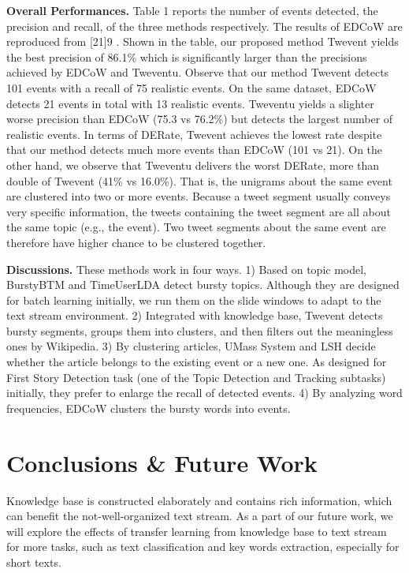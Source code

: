 \documentclass{article}
\begin{document}
\textbf{Overall Performances.}
Table 1 reports the number of events
detected, the precision and recall, of the three methods respectively.
The results of EDCoW are reproduced from [21]9
. Shown in the
table, our proposed method Twevent yields the best precision of
86.1\% which is significantly larger than the precisions achieved
by EDCoW and Tweventu. Observe that our method Twevent detects
101 events with a recall of 75 realistic events. On the same
dataset, EDCoW detects 21 events in total with 13 realistic events.
Tweventu yields a slighter worse precision than EDCoW (75.3%
vs 76.2\%) but detects the largest number of realistic events. In
terms of DERate, Twevent achieves the lowest rate despite that our
method detects much more events than EDCoW (101 vs 21). On
the other hand, we observe that Tweventu delivers the worst DERate,
more than double of Twevent (41\% vs 16.0\%). That is, the unigrams
about the same event are clustered into two or more events.
Because a tweet segment usually conveys very specific information,
the tweets containing the tweet segment are all about the same
topic (e.g., the event). Two tweet segments about the same event
are therefore have higher chance to be clustered together.

\textbf{Discussions.} 
These methods work in four ways. 
1) Based on topic model, BurstyBTM and TimeUserLDA detect bursty topics. 
Although they are designed for batch learning initially, we run them on the slide windows to adapt to the text stream environment.
2) Integrated with knowledge base, Twevent detects bursty segments, groups them into clusters, and then filters out the meaningless ones by Wikipedia.
3) By clustering articles, UMass System and LSH decide whether the article belongs to the existing event or a new one.
As designed for First Story Detection task (one of the Topic Detection and Tracking subtasks\cite{allan2012topic}) initially, they prefer to enlarge the recall of detected events. 
4) By analyzing word frequencies, EDCoW clusters the bursty words into events.

\section{Conclusions \& Future Work}
Knowledge base is constructed elaborately and contains rich information, which can benefit the not-well-organized text stream. 
As a part of our future work, we will explore the effects of transfer learning from knowledge base to text stream for more tasks, such as text classification and key words extraction, especially for short texts. 
\end{document}
